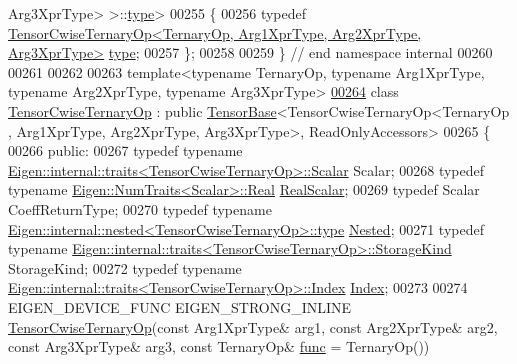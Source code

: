 \begin{DoxyCode}
      Arg3XprType> >::\hyperlink{class_eigen_1_1_tensor_cwise_ternary_op}{type}>
00255 \{
00256   \textcolor{keyword}{typedef} \hyperlink{class_eigen_1_1_tensor_cwise_ternary_op}{TensorCwiseTernaryOp<TernaryOp, Arg1XprType, Arg2XprType, Arg3XprType>}
       \hyperlink{class_eigen_1_1_tensor_cwise_ternary_op}{type};
00257 \};
00258 
00259 \}  \textcolor{comment}{// end namespace internal}
00260 
00261 
00262 
00263 \textcolor{keyword}{template}<\textcolor{keyword}{typename} TernaryOp, \textcolor{keyword}{typename} Arg1XprType, \textcolor{keyword}{typename} Arg2XprType, \textcolor{keyword}{typename} Arg3XprType>
\hyperlink{class_eigen_1_1_tensor_cwise_ternary_op}{00264} \textcolor{keyword}{class }\hyperlink{class_eigen_1_1_tensor_cwise_ternary_op}{TensorCwiseTernaryOp} : \textcolor{keyword}{public} \hyperlink{class_eigen_1_1_tensor_base}{TensorBase}<TensorCwiseTernaryOp<TernaryOp
      , Arg1XprType, Arg2XprType, Arg3XprType>, ReadOnlyAccessors>
00265 \{
00266   \textcolor{keyword}{public}:
00267     \textcolor{keyword}{typedef} \textcolor{keyword}{typename} \hyperlink{struct_eigen_1_1internal_1_1traits}{Eigen::internal::traits<TensorCwiseTernaryOp>::Scalar}
       Scalar;
00268     \textcolor{keyword}{typedef} \textcolor{keyword}{typename} \hyperlink{group___sparse_core___module}{Eigen::NumTraits<Scalar>::Real} 
      \hyperlink{group___sparse_core___module}{RealScalar};
00269     \textcolor{keyword}{typedef} Scalar CoeffReturnType;
00270     \textcolor{keyword}{typedef} \textcolor{keyword}{typename} \hyperlink{class_eigen_1_1internal_1_1_tensor_lazy_evaluator_writable}{Eigen::internal::nested<TensorCwiseTernaryOp>::type}
       \hyperlink{class_eigen_1_1internal_1_1_tensor_lazy_evaluator_writable}{Nested};
00271     \textcolor{keyword}{typedef} \textcolor{keyword}{typename} \hyperlink{struct_eigen_1_1internal_1_1traits}{Eigen::internal::traits<TensorCwiseTernaryOp>::StorageKind}
       StorageKind;
00272     \textcolor{keyword}{typedef} \textcolor{keyword}{typename} \hyperlink{struct_eigen_1_1internal_1_1traits}{Eigen::internal::traits<TensorCwiseTernaryOp>::Index}
       \hyperlink{namespace_eigen_a62e77e0933482dafde8fe197d9a2cfde}{Index};
00273 
00274     EIGEN\_DEVICE\_FUNC EIGEN\_STRONG\_INLINE \hyperlink{class_eigen_1_1_tensor_cwise_ternary_op}{TensorCwiseTernaryOp}(\textcolor{keyword}{const} Arg1XprType& arg1,
       \textcolor{keyword}{const} Arg2XprType& arg2, \textcolor{keyword}{const} Arg3XprType& arg3, \textcolor{keyword}{const} TernaryOp& \hyperlink{structfunc}{func} = TernaryOp())

\end{DoxyCode}
